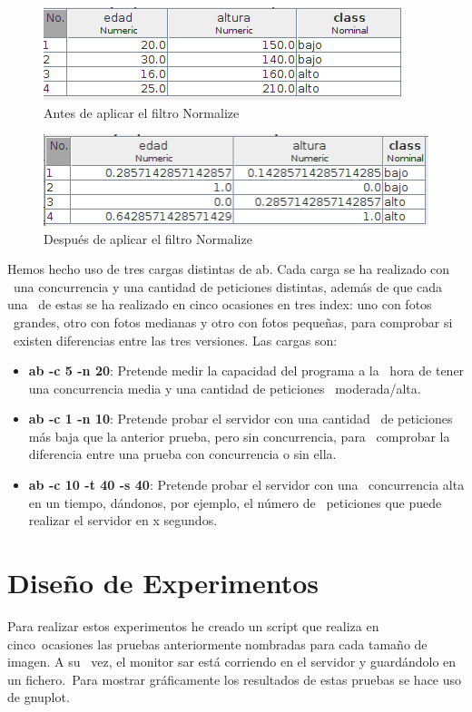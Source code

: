 \documentclass[11pt,twoside,a4paper]{book}
\begin{document}
\begin{figure}[H]
   \includegraphics[width=\textwidth]{ejercicio5_1.png}
	\caption{Antes de aplicar el filtro Normalize}
	\label{Fig11}
\end{figure}
\begin{figure}[H]
   \includegraphics[width=\textwidth]{ejercicio5_2.png}
	\caption{Después de aplicar el filtro Normalize}
	\label{Fig12}
\end{figure}


Hemos hecho uso de tres cargas distintas de ab. Cada carga se ha realizado con \
una concurrencia y una cantidad de peticiones distintas, además de que cada una \
de estas se ha realizado en cinco ocasiones en tres index: uno con fotos \
grandes, otro con fotos medianas y otro con fotos pequeñas, para comprobar si \
existen diferencias entre las tres versiones. Las cargas son:
\begin{itemize}
  \item \textbf{ab -c 5 -n 20}: Pretende medir la capacidad  del programa a la \
  hora de tener una concurrencia media y una cantidad de peticiones \
  moderada/alta.
  \item \textbf{ab -c 1 -n 10}: Pretende probar el servidor con una cantidad \
  de peticiones más baja que la anterior prueba, pero sin concurrencia, para \
  comprobar la diferencia entre una prueba con concurrencia o sin ella.
  \item \textbf{ab -c 10 -t 40 -s 40}: Pretende probar el servidor con una \
  concurrencia alta en un tiempo, dándonos, por ejemplo, el número de \
  peticiones que puede realizar el servidor en x segundos.
\end{itemize}

\section{Diseño de Experimentos}
Para realizar estos experimentos he creado un script que realiza en cinco\
ocasiones las pruebas anteriormente nombradas para cada tamaño de imagen. A su \
vez, el monitor sar está corriendo en el servidor y guardándolo en un fichero.\
Para mostrar gráficamente los resultados de estas pruebas se hace uso de gnuplot.
\end{document}
